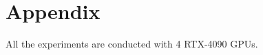 \newpage
\appendix
\section{Appendix}\label{app}
All the experiments %
are 
conducted with 4 RTX-4090 GPUs.


